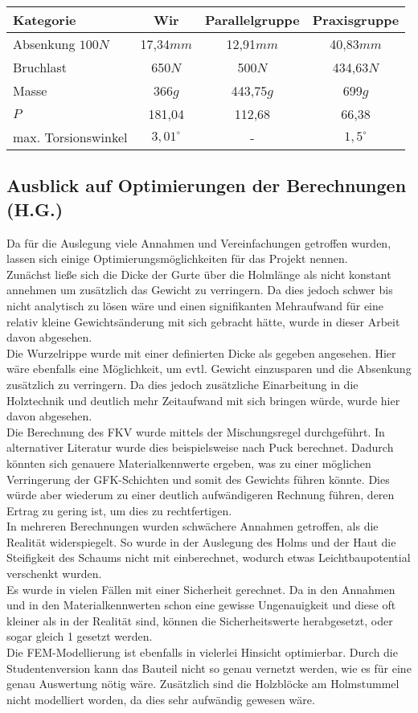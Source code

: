 \begin{center}
\begin{tabular}[h]{l|c|c|c}
Kategorie&Wir&Parallelgruppe&Praxisgruppe\\
\hline
Absenkung $100N$&17,34$mm$&12,91$mm$&40,83$mm$\\
Bruchlast&650$N$&500$N$&434,63$N$\\
Masse&366$g$&443,75$g$&699$g$\\
$P$&181,04&112,68&66,38\\
max. Torsionswinkel&$3,01^{\circ}$& - &$1,5^{\circ}$
\end{tabular}
\end{center}


\subsection{Ausblick auf Optimierungen der Berechnungen (H.G.)}
Da für die Auslegung viele Annahmen und Vereinfachungen getroffen wurden, lassen sich einige Optimierungsmöglichkeiten für das Projekt nennen.\\
\noindent
Zunächst ließe sich die Dicke der Gurte über die Holmlänge als nicht konstant annehmen um zusätzlich das Gewicht zu verringern. Da dies jedoch schwer bis nicht analytisch zu lösen wäre und einen signifikanten Mehraufwand für eine relativ kleine Gewichtsänderung mit sich gebracht hätte, wurde in dieser Arbeit davon abgesehen.\\
\noindent
Die Wurzelrippe wurde mit einer definierten Dicke als gegeben angesehen. Hier wäre ebenfalls eine Möglichkeit, um evtl. Gewicht einzusparen und die Absenkung zusätzlich zu verringern. Da dies jedoch zusätzliche Einarbeitung in die Holztechnik und deutlich mehr Zeitaufwand mit sich bringen würde, wurde hier davon abgesehen.\\
\noindent
Die Berechnung des FKV wurde mittels der Mischungsregel durchgeführt. In alternativer Literatur wurde dies beispielsweise nach Puck berechnet. Dadurch könnten sich genauere Materialkennwerte ergeben, was zu einer möglichen Verringerung der GFK-Schichten und somit des Gewichts führen könnte. Dies würde aber wiederum zu einer deutlich aufwändigeren Rechnung führen, deren Ertrag zu gering ist, um dies zu rechtfertigen.\\
\noindent
In mehreren Berechnungen wurden schwächere Annahmen getroffen, als die Realität widerspiegelt. So wurde in der Auslegung des Holms und der Haut die Steifigkeit des Schaums nicht mit einberechnet, wodurch etwas Leichtbaupotential verschenkt wurden.\\
\noindent
Es wurde in vielen Fällen mit einer Sicherheit gerechnet. Da in den Annahmen und in den Materialkennwerten schon eine gewisse Ungenauigkeit und diese oft kleiner als in der Realität sind, können die Sicherheitswerte herabgesetzt, oder sogar gleich 1 gesetzt werden.\\
\noindent
Die FEM-Modellierung ist ebenfalls in vielerlei Hinsicht optimierbar. Durch die Studentenversion kann das Bauteil nicht so genau vernetzt werden, wie es für eine genau Auswertung nötig wäre. Zusätzlich sind die Holzblöcke am Holmstummel nicht modelliert worden, da dies sehr aufwändig gewesen wäre.\\
\noindent